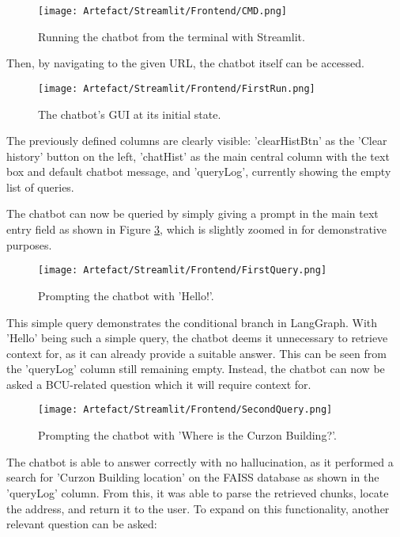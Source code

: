 \begin{figure}[H]
    \centering
    \texttt{[image: Artefact/Streamlit/Frontend/CMD.png]}
    \caption{Running the chatbot from the terminal with Streamlit. \label{fig:RunApp}}
\end{figure}

\noindent Then, by navigating to the given URL, the chatbot itself can be accessed.

\begin{figure}[H]
    \centering
    \texttt{[image: Artefact/Streamlit/Frontend/FirstRun.png]}
    \caption{The chatbot's GUI at its initial state. \label{fig:FirstRun}}
\end{figure}

\noindent The previously defined columns are clearly visible: 'clearHistBtn' as the 'Clear history' button on the left, 'chatHist' as the main 
central column with the text box and default chatbot message, and 'queryLog', currently showing the empty list of queries. 

\para The chatbot can now be queried by simply giving a prompt in the main text entry field as shown in Figure \ref{fig:FirstQuery}, 
which is slightly zoomed in for demonstrative purposes.

\begin{figure}[H]
    \centering
    \texttt{[image: Artefact/Streamlit/Frontend/FirstQuery.png]}
    \caption{Prompting the chatbot with 'Hello!'. \label{fig:FirstQuery}}
\end{figure}

\noindent This simple query demonstrates the conditional branch in LangGraph. With 'Hello' being such a simple query, the chatbot deems 
it unnecessary to retrieve context for, as it can already provide a suitable answer. This can be seen from the 'queryLog' column still 
remaining empty. Instead, the chatbot can now be asked a BCU-related question which it will require context for.

\begin{figure}[H]
    \centering
    \texttt{[image: Artefact/Streamlit/Frontend/SecondQuery.png]}
    \caption{Prompting the chatbot with 'Where is the Curzon Building?'. \label{fig:SecondQuery}}
\end{figure}

\noindent The chatbot is able to answer correctly with no hallucination, as it performed a search for 'Curzon Building location' on the 
FAISS database as shown in the 'queryLog' column. From this, it was able to parse the retrieved chunks, locate the address, and return it to the
user. To expand on this functionality, another relevant question can be asked:


